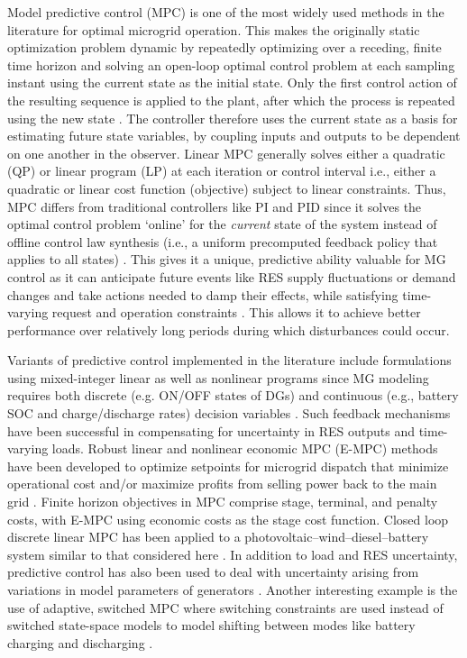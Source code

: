 \documentclass[final,3p,times]{elsarticle}
\begin{document}
Model predictive control (MPC) is one of the most widely used methods in the literature for optimal microgrid operation. This makes the originally static optimization problem dynamic by repeatedly optimizing over a receding, finite time horizon and solving an open-loop optimal control problem at each sampling instant using the current state as the initial state. Only the first control action of the resulting sequence is applied to the plant, after which the process is repeated using the new state \cite{mpc}. The controller therefore uses the current state as a basis for estimating future state variables, by coupling inputs and outputs to be dependent on one another in the observer. Linear MPC generally solves either a quadratic (QP) or linear program (LP) at each iteration or control interval i.e., either a quadratic or linear cost function (objective) subject to linear constraints. Thus, MPC differs from traditional controllers like PI and PID since it solves the optimal control problem `online' for the \textit{current} state of the system instead of offline control law synthesis (i.e., a uniform precomputed feedback policy that applies to all states) \cite{mpc}. This gives it a unique, predictive ability valuable for MG control as it can anticipate future events like RES supply fluctuations or demand changes and take actions needed to damp their effects, while satisfying time-varying request and operation constraints \cite{parisio2014}. This allows it to achieve better performance over relatively long periods during which disturbances could occur.

Variants of predictive control implemented in the literature include formulations using mixed-integer linear as well as nonlinear programs since MG modeling requires both discrete (e.g. ON/OFF states of DGs) and continuous (e.g., battery SOC and charge/discharge rates) decision variables \cite{parisio2013, parisio2014}. Such feedback mechanisms have been successful in compensating for uncertainty in RES outputs and time-varying loads. Robust linear and nonlinear economic MPC (E-MPC) methods have been developed to optimize setpoints for microgrid dispatch that minimize operational cost \cite{zachar2016} and/or maximize profits from selling power back to the main grid \cite{pereira2017}. Finite horizon objectives in MPC comprise stage, terminal, and penalty costs, with E-MPC using economic costs as the stage cost function. Closed loop discrete linear MPC has been applied to a photovoltaic--wind--diesel--battery system similar to that considered here \cite{tazvinga2014}. In addition to load and RES uncertainty, predictive control has also been used to deal with uncertainty arising from variations in model parameters of generators \cite{prodan2014}. Another interesting example is the use of adaptive, switched MPC where switching constraints are used instead of switched state-space models to model shifting between modes like battery charging and discharging \cite{zhu2015}.
\end{document}
